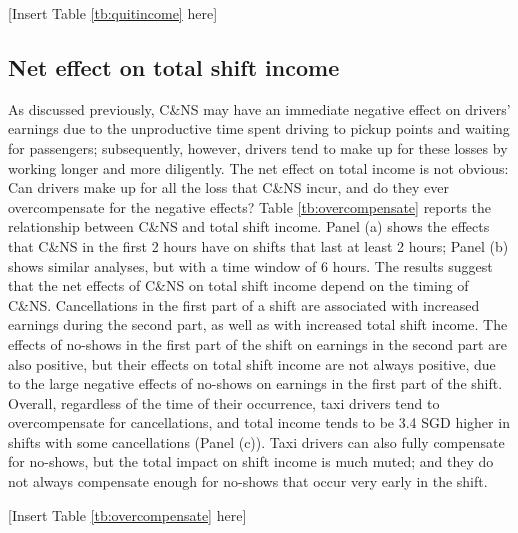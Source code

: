 \documentclass[reviewmode,AEJ]{AEA}
\begin{document}
\begin{center}
	[Insert Table \ref{tb:quitincome} here]
\end{center}

\subsection{Net effect on total shift income}


As discussed previously, C\&NS may have an immediate negative effect on drivers' earnings due to the 
unproductive time spent driving to pickup points and waiting for passengers; subsequently, however, 
drivers tend to make up for these losses by working longer and more diligently. The net effect on total
income is not obvious: Can drivers make up for all the loss that C\&NS incur, and do they ever 
overcompensate for the negative effects? Table \ref{tb:overcompensate} reports the relationship between 
C\&NS and total shift income. Panel (a) shows the effects that C\&NS in the first 2 hours have on shifts
that last at least 2 hours; Panel (b) shows similar analyses, but with a time window of 6 hours. 
The results suggest that the net effects of C\&NS on total shift income depend on the timing of C\&NS.
Cancellations in the first part of a shift are associated with increased earnings during the second part,
as well as with increased total shift income. The effects of no-shows in the first part of the shift on 
earnings in the second part are also positive, but their effects on total shift income are not always 
positive, due to the large negative effects of no-shows on earnings in the first part of the shift. 
Overall, regardless of the time of their occurrence, taxi drivers tend to overcompensate for cancellations,
and total income tends to be 3.4 SGD higher in shifts with some cancellations (Panel (c)). 
Taxi drivers can also fully compensate for no-shows, but the total impact on shift income is much muted;
and they do not always compensate enough for no-shows that  occur very early in the shift. 

\begin{center}
	[Insert Table \ref{tb:overcompensate} here]
\end{center}
\end{document}
